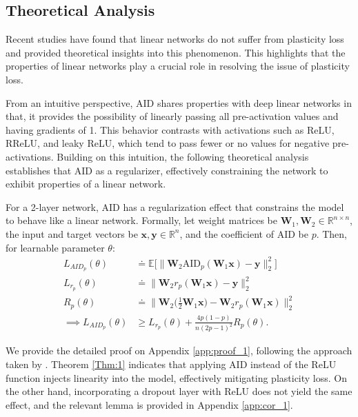 \subsection{Theoretical Analysis}
\label{Sec:TheoreticalAnalysis}


Recent studies \citep{dohare2024loss, lewandowski2024plastic} have found that linear networks do not suffer from plasticity loss and provided theoretical insights into this phenomenon.
This highlights that the properties of linear networks play a crucial role in resolving the issue of plasticity loss.

From an intuitive perspective, AID shares properties with deep linear networks in that, it provides the possibility of linearly passing all pre-activation values and having gradients of 1.
This behavior contrasts with activations such as ReLU, RReLU, and leaky ReLU, which tend to pass fewer or no values for negative pre-activations.
Building on this intuition, the following theoretical analysis establishes that AID as a regularizer, effectively constraining the network to exhibit properties of a linear network.

\begin{theorem}
    \label{Thm:1}
    For a 2-layer network, AID has a regularization effect that constrains the model to behave like a linear network. Formally,  let weight matrices be \( \mathbf{W}_1, \mathbf{W}_2 \in \mathbb R^{n\times n} \), the input and target vectors be \( \mathbf{x}, \mathbf{y} \in \mathbb R^n\), and the coefficient of AID be $p$. Then, for learnable parameter $\theta$:
 \begin{align*}L_{AID_p}(\theta) &\doteq\mathbb{E}\big[\|\mathbf{W}_2 \text{AID}_p(\mathbf{W}_1 \mathbf{x}) - \mathbf{y}\|_2^2 \big] \\L_{r_p}(\theta) &\doteq \|\mathbf{W}_2 r_p(\mathbf{W}_1 \mathbf{x}) - \mathbf{y}\|_2^2 \\ R_p(\theta) &\doteq  \|\mathbf{W}_2 \big(\frac{1}{2}\mathbf{W}_1 \mathbf{x}\big) - \mathbf{W}_2 r_p(\mathbf{W}_1 \mathbf{x})\|_2^2 \\ \implies L_{AID_p}(\theta) &\geq L_{r_p}(\theta) + \frac{4p(1-p)}{n(2p-1)^2}R_p(\theta).
\end{align*}
\end{theorem}

We provide the detailed proof on Appendix \ref{app:proof_1}, following the approach taken by \citet{liang2021drop}.
Theorem \ref{Thm:1} indicates that applying AID instead of the ReLU function injects linearity into the model, effectively mitigating plasticity loss.
On the other hand, incorporating a dropout layer with ReLU does not yield the same effect, and the relevant lemma is provided in Appendix \ref{app:cor_1}.

